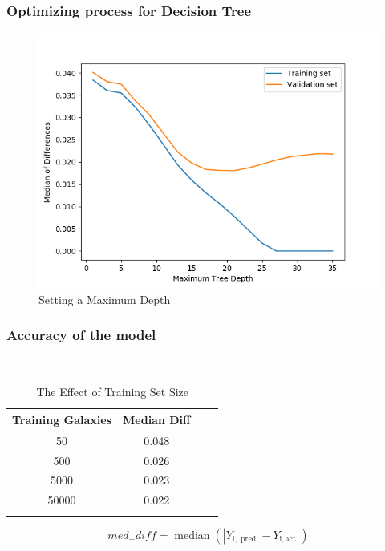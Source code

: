 \documentclass{beamer}
\begin{document}
\begin{frame}
	\frametitle{Optimizing process for Decision Tree}
    \begin{figure}
        \includegraphics[scale=0.4]{img/overfiting_tree.png}
        \caption*{Setting a Maximum Depth}
    \end{figure}
    \end{frame}
\begin{frame}
	\frametitle{Accuracy of the model}
    \begin{table}[ht]\
        \caption*{The Effect of Training Set Size} %
        \centering %
        \begin{tabular}{c c c c} %
        \hline\hline %
        Training Galaxies & Median Diff \\ [0.5ex] %
        \hline %
        50 & 0.048  \\ %
        500 & 0.026  \\
        5000 & 0.023  \\
        50000 & 0.022  \\ [1ex] %
        \hline %
        \\
        \end{tabular}
        \label{table:nonlin} %
        \end{table}
        \begin{equation}
            m e d_{-} d i f f=\operatorname{median}\left(\left|Y_{\mathrm{i}, \text { pred }}-Y_{\mathrm{i}, \mathrm{act}}\right|\right)
            \end{equation}
    \end{frame}
\end{document}
